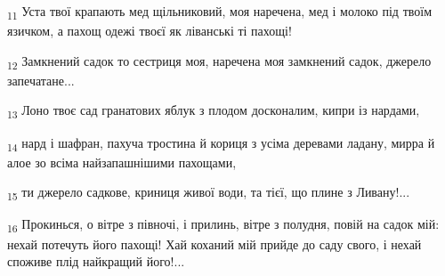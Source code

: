 \begin{tcolorbox}
\textsubscript{11} Уста твої крапають мед щільниковий, моя наречена, мед і молоко під твоїм язичком, а пахощ одежі твоєї як ліванські ті пахощі!
\end{tcolorbox}
\begin{tcolorbox}
\textsubscript{12} Замкнений садок то сестриця моя, наречена моя замкнений садок, джерело запечатане...
\end{tcolorbox}
\begin{tcolorbox}
\textsubscript{13} Лоно твоє сад гранатових яблук з плодом досконалим, кипри із нардами,
\end{tcolorbox}
\begin{tcolorbox}
\textsubscript{14} нард і шафран, пахуча тростина й кориця з усіма деревами ладану, мирра й алое зо всіма найзапашнішими пахощами,
\end{tcolorbox}
\begin{tcolorbox}
\textsubscript{15} ти джерело садкове, криниця живої води, та тієї, що плине з Ливану!...
\end{tcolorbox}
\begin{tcolorbox}
\textsubscript{16} Прокинься, о вітре з півночі, і прилинь, вітре з полудня, повій на садок мій: нехай потечуть його пахощі! Хай коханий мій прийде до саду свого, і нехай споживе плід найкращий його!...
\end{tcolorbox}
